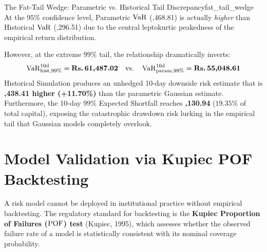 \begin{empiricalbox}{The Fat-Tail Wedge: Parametric vs. Historical Tail Discrepancy}{fat_tail_wedge}
At the $95\%$ confidence level, Parametric $\operatorname{VaR}$ (,468.81) is actually \textit{higher} than Historical $\operatorname{VaR}$ (,296.51) due to the central leptokurtic peakedness of the empirical return distribution. 

However, at the extreme $99\%$ tail, the relationship dramatically inverts:
\begin{equation}
\operatorname{VaR}_{\text{hist}, 99\%}^{10\text{d}} = \text{\textbf{\text{Rs.}\,61,487.02}} \quad \text{vs.} \quad \operatorname{VaR}_{\text{param}, 99\%}^{10\text{d}} = \text{\textbf{\text{Rs.}\,55,048.61}}
\end{equation}
Historical Simulation produces an unhedged 10-day downside risk estimate that is \textbf{,438.41 higher (+11.70\%)} than the parametric Gaussian estimate. Furthermore, the 10-day $99\%$ Expected Shortfall reaches \textbf{,130.94} ($19.35\%$ of total capital), exposing the catastrophic drawdown risk lurking in the empirical tail that Gaussian models completely overlook.
\end{empiricalbox}

\section{Model Validation via Kupiec POF Backtesting}
\label{sec:kupiec_backtesting}

A risk model cannot be deployed in institutional practice without empirical backtesting. The regulatory standard for backtesting is the \textbf{Kupiec Proportion of Failures ($\operatorname{POF}$) test} (Kupiec, 1995), which assesses whether the observed failure rate of a model is statistically consistent with its nominal coverage probability.

